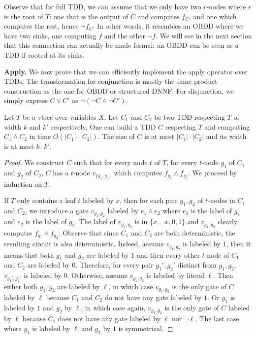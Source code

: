 \documentclass[a4paper,UKenglish,cleveref, autoref, thm-restate]{lipics-v2021}
\begin{document}
\begin{toappendix}
Observe that for full TDD, we can assume that we only have two $r$-nodes where $r$ is the root of $T$: one that is the output of $C$ and computes $f_C$, and one which computes the rest, hence $\neg f_C$. In other words, it resembles an OBDD where we have two sinks, one computing $f$ and the other $\neg f$. We will see in the next section that this connection can actually be made formal: an OBDD can be seen as a TDD if rooted at its sinks. 

\textbf{Apply.} We now prove that we can efficiently implement the apply operator over TDDs. The transformation for conjunction is mostly the same product construction as the one for OBDD or structured DNNF. For disjunction, we simply express $C \vee C'$ as $\neg (\neg C \wedge \neg C')$.

\begin{proposition}
  \label{prop:prop:tdd-and} Let $T$ be a vtree over variables $X$. Let $C_1$ and $C_2$ be two TDD respecting $T$ of width $k$ and $k'$ respectively. One can build a TDD $C$ respecting $T$ and computing $C_1 \wedge C_2$ in time $O(|C_1|\cdot|C_2|)$. The size of $C$ is at most $|C_1| \cdot |C_2|$ and its width is at most $k \cdot k'$. 
\end{proposition}
\begin{proof}
  We construct $C$ such that for every node $t$ of $T$, for every $t$-node $g_1$ of $C_1$ and $g_2$ of $C_2$, $C$ has a $t$-node $v_{\{g_1,g_2\}}$ which computes $f_{g_1}  \wedge f_{g_2}$. We proceed by induction on $T$.

  If $T$ only contains a leaf $t$ labeled by $x$, then for each pair $g_1,g_2$ of $t$-nodes in $C_1$ and $C_2$, we introduce a gate $v_{g_1,g_2}$ labeled by $e_1 \wedge e_2$ where $e_1$ is the label of $g_1$ and $e_2$ is the label of $g_2$. The label of $v_{g_1,g_2}$ is in $\{x,\neg x, 0, 1\}$ and $v_{g_1,g_2}$ clearly computes $f_{g_1} \wedge f_{g_2}$. Observe that since $C_1$ and $C_2$ are both deterministic, the resulting circuit is also deterministic. Indeed, assume $v_{g_1,g_2}$ is labeled by $1$, then it means that both $g_1$ and $g_2$ are labeled by $1$ and then every other $t$-node of $C_1$ and $C_2$ are labeled by $0$. Therefore, for every pair $g_1',g_2'$ distinct from $g_1,g_2$, $v_{g_1',g_2'}$ is labeled by $0$.  Otherwise, assume $v_{g_1,g_2}$ is labeled by literal $\ell$. Then either both $g_1,g_2$ are labeled by $\ell$, in which case $v_{g_1,g_2}$ is the only gate of $C$ labeled by $\ell$ because $C_1$ and $C_2$ do not have any gate labeled by $1$. Or $g_1$ is labeled by $1$ and $g_2$ by $\ell$, in which case again, $v_{g_1,g_2}$ is the only gate of $C$ labeled by $\ell$ because $C_1$ does not have any gate labeled by $\ell$ nor $\neg \ell$. The last case where $g_1$ is labeled by $\ell$ and $g_2$ by $1$ is symmetrical.


\end{proof}
\end{toappendix}
\end{document}
